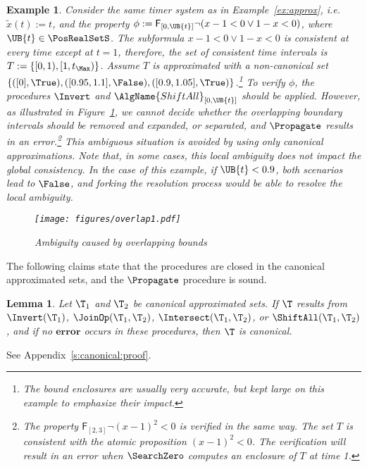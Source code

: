 \documentclass[paper]{ieice}
\newcommand{\Eventually}{\mathsf{F}}
\newtheorem{lemma}{Lemma}
\newtheorem{example}{Example}
\newenvironment{proof}[1][Proof.]{\begin{trivlist}
\item[\hskip \labelsep {\itshape #1}]}{\end{trivlist}}
\begin{document}
\begin{example}
Consider the same timer system as in Example~\ref{ex:approx}, i.e. $\tilde{x}(t) := t$,
and the property 
$\phi := \Eventually_{[0,\UB{t}]} \neg (x-1 < 0 \lor 1-x < 0)$, where $\UB{t} \in \PosRealSetS$.
The subformula $x-1 < 0 \lor 1-x < 0$ is consistent at every time except at $t = 1$, therefore, the set of consistent time intervals is $T := \{[0,1),[1,t_\Max)\}$.
Assume $T$ is approximated with a non-canonical set $\{([0],\True),([0.95,1.1],\False),([0.9,1.05],\True)\}$.\footnote{The bound enclosures are usually very accurate, but kept large on this example to emphasize their impact.}
To verify $\phi$, the procedures $\Invert$ and $\AlgName{ShiftAll}_{[0,\UB{t}]}$ should be applied.
However, as illustrated in Figure~\ref{f:overlap}, we cannot decide whether the overlapping boundary intervals should be removed and expanded, or separated, and $\Propagate$ results in an error.\footnote{The property $\Eventually_{[2,3]} \neg (x-1)^2 < 0$ is verified in the same way. The set $T$ is consistent with the atomic proposition $(x-1)^2 < 0$. The verification will result in an error when $\SearchZero$ computes an enclosure of $T$ at time 1.} This ambiguous situation is avoided by using only canonical approximations. Note that, in some cases, this local ambiguity does not impact the global consistency. In the case of this example, if $\UB{t} < 0.9$, both scenarios lead to $\False$, and forking the resolution process would be able to resolve the local ambiguity.

\begin{figure}[ht]
	\vspace{-1em}
\centering
\texttt{[image: figures/overlap1.pdf]}
\caption{Ambiguity caused by overlapping bounds}
\label{f:overlap}
\end{figure}
\end{example}

The following claims state that the procedures are closed in the canonical approximated sets, and the $\Propagate$ procedure is sound.

\begin{lemma} \label{th:canonical}
	Let $\T_1$ and $\T_2$ be canonical approximated sets.
	If $\T$ results from $\Invert(\T_1)$, $\JoinOp(\T_1,\T_2)$, $\Intersect(\T_1,\T_2)$, or $\ShiftAll(\T_1,\T_2)$, and if no $\mathbf{error}$ occurs in these procedures, then $\T$ is canonical.
\end{lemma}
\begin{proof}
	See Appendix~\ref{s:canonical:proof}.
\end{proof}
\end{document}
